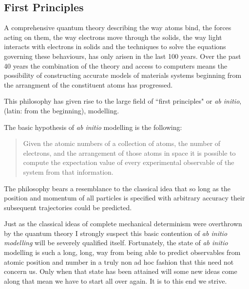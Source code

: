 \subsection{First Principles}
A comprehensive quantum theory describing the way atoms bind, the forces acting on them, 
the way electrons move through the solids, the way light interacts with electrons in solids
and the techniques to solve the equations governing these behaviours, has only 
arisen in the last 100 years. 
%
Over the past 40 years the combination of the theory and access to computers 
means the possibility of constructing accurate models of materials 
systems beginning from the arrangment of the constituent atoms has
progressed. 
%

This philosophy has given rise to the large field of ``first principles" or {\it ab initio}, 
(latin: from the beginning), modelling. 
%

The basic hypothesis of {\it ab initio} modelling is the following:  

\begin{quote}
Given the atomic numbers of a collection of atoms,
the number of electrons, and the arrangement of those atoms 
in space it is possible to compute
the expectation value of every experimental
observable of the system from that information.
\end{quote}

The philosophy bears a resemblance to the classical idea
that so long as the position and momentum of all particles 
is specified with arbitrary accuracy their subsequent 
trajectories could be predicted. 

Just as the classical ideas of complete mechanical determinism were
overthrown by the quantum theory I strongly suspect this
basic contention of {\it ab initio modelling} 
will be severely qualified itself. Fortunately, the 
state of {\it ab initio} modelling is such a long, long, way from being
able to predict observables from atomic position and number
in a truly non ad hoc fashion that this need not concern us. 
Only when that state has been attained
will some new ideas come along that mean 
we have to start all over again. It is to this end we strive.

